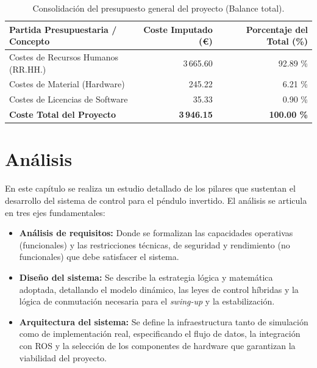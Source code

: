 \documentclass[11pt,fleqn]{book} %
\begin{document}
\begin{table}[!htbp]
	\centering
	\caption{Consolidación del presupuesto general del proyecto (Balance total).}
	\label{tab:coste_total}
	\small %
	\begin{tabularx}{\textwidth}{@{} X r r @{}}
		\toprule
		\textbf{Partida Presupuestaria / Concepto} & \textbf{Coste Imputado (\euro)} & \textbf{Porcentaje del Total (\%)} \\ 
		\midrule
		Costes de Recursos Humanos (RR.HH.)        & 3\,665.60                       & 92.89 \%                           \\
		Costes de Material (Hardware)              & 245.22                          & 6.21 \%                            \\
		Costes de Licencias de Software            & 35.33                           & 0.90 \%                            \\ 
		\midrule
		\textbf{Coste Total del Proyecto}          & \textbf{3\,946.15}              & \textbf{100.00 \%}                 \\ 
		\bottomrule
	\end{tabularx}
\end{table}
\FloatBarrier 

\chapter{Análisis}
\label{cap:analisis}
En este capítulo se realiza un estudio detallado de los pilares que sustentan el desarrollo del sistema de control para el péndulo invertido. El análisis se articula en tres ejes fundamentales:

\begin{itemize}
	\item \textbf{Análisis de requisitos:} Donde se formalizan las capacidades operativas (funcionales) y las restricciones técnicas, de seguridad y rendimiento (no funcionales) que debe satisfacer el sistema.
	
	\item \textbf{Diseño del sistema:} Se describe la estrategia lógica y matemática adoptada, detallando el modelo dinámico, las leyes de control híbridas y la lógica de conmutación necesaria para el \textit{swing-up} y la estabilización.
	
	\item \textbf{Arquitectura del sistema:} Se define la infraestructura tanto de simulación como de implementación real, especificando el flujo de datos, la integración con ROS y la selección de los componentes de hardware que garantizan la viabilidad del proyecto.
	 
\end{itemize}
\newpage
\end{document}
